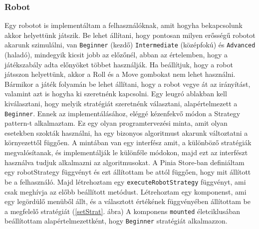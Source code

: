 \documentclass[a4paper,twoside]{article}
\begin{document}
\subsubsection{Robot}
Egy robotot is implementáltam a felhasználóknak, amit hogyha bekapcsolunk akkor helyettünk játszik. Be lehet állítani, hogy pontosan milyen erősségű robotot akarunk szimulálni, van \verb|Beginner| (kezdő) \verb|Intermediate| (középfokú) és \verb|Advanced| (haladó), mindegyik kicsit jobb az előzőnél, abban az értelemben, hogy a játékszabály adta előnyöket többet használják. Ha beállítjuk, hogy a robot játsszon helyettünk, akkor a Roll és a Move gombokat nem lehet használni. Bármikor a játék folyamán be lehet állítani, hogy a robot vegye át az irányítást, valamint azt is hogyha ki szeretnénk kapcsolni. Egy leugró ablakban kell kiválasztani, hogy melyik stratégiát szeretnénk választani, alapértelmezett a \verb|Beginner|. Ennek az implementálásához, eléggé kézenfekvő módon a Strategy pattern-t \cite{strategy} alkalmaztam. Ez egy olyan programtervezési minta, amit olyan esetekben szokták használni, ha egy bizonyos algoritmust akarunk változtatni a környezettől függően. A mintában van egy interfész amit, a különböző stratégiák megvalósítanak, és implementálják le különféle módokon, majd ezt az interfészt használva tudjuk alkalmazni az algoritmusokat. A Pinia Store-ban definiáltam egy robotStrategy függvényt és ezt állítottam be attól függően, hogy mit állított be a felhasználó. Majd létrehoztam egy \verb|executeRobotStrategy| függvényt, ami csak meghívja az előbb beállított metódust. Létrehoztam egy komponenst, ami egy legördülő menüből állt, és a választott értékének függvényében állítottam be a megfelelő stratégiát (\ref{setStrat}. ábra) A komponens \verb|mounted| életciklusában beállítottam alapértelmezettként, hogy \verb|Beginner| stratégiát alkalmazzon.
\end{document}

